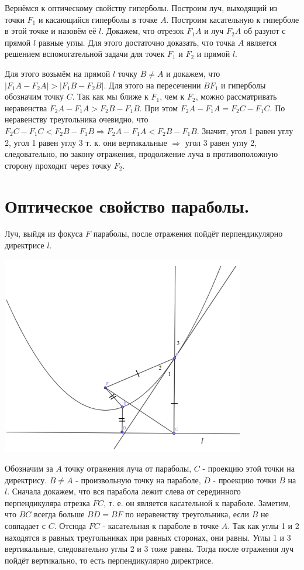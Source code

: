 \documentclass[12pt]{article}
\begin{document}
\begin{sloppypar}
    Вернёмся к оптическому свойству гиперболы. Построим луч, выходящий из точки $F_1$ и касающийся гиперболы в точке $A$. Построим касательную к гиперболе в этой точке и назовём её $l$. Докажем, что отрезок $F_1A$ и луч $F_2A$ об разуют с прямой $l$ равные углы. Для этого достаточно доказать, что точка $A$ является решением вспомогательной задачи для точек $F_1$ и $F_2$ и прямой $l$.

    Для этого возьмём на прямой $l$ точку $B \neq A$ и докажем, что $|F_1A - F_2A| > |F_1B - F_2B|$. Для этого на пересечении $BF_1$ и гиперболы обозначим точку $C$. Так как мы ближе к $F_1$, чем к $F_2$, можно рассматривать неравенства $F_2A - F_1A > F_2B - F_1B$. При этом $F_2A - F_1A = F_2C - F_1C$. По неравенству треугольника очевидно, что $F_2C - F_1C < F_2B - F_1B \Rightarrow F_2A - F_1A < F_2B - F_1B$. Значит, угол 1 равен углу 2, угол 1 равен углу 3 т. к. они вертикальные $\Rightarrow$ угол 3 равен углу 2, следовательно, по закону отражения, продолжение луча в противоположную сторону проходит через точку $F_2$.


    \section{Оптическое свойство параболы.}
    Луч, выйдя из фокуса $F$ параболы, после отражения пойдёт перпендикулярно директрисе $l$.

    \includegraphics[width=0.8\textwidth]{graphics/Парабола.png}

    Обозначим за $A$ точку отражения луча от параболы, $C$ - проекцию этой точки на директрису. $B \neq A$ - произвольную точку на параболе, $D$ - проекцию точки $B$ на $l$. Сначала докажем, что вся парабола лежит слева от серединного перпендикуляра отрезка $FC$, т. е. он является касательной к параболе. Заметим, что $BC$ всегда больше $BD = BF$ по неравенству треугольника, если $B$ не совпадает с $C$. Отсюда $FC$ - касательная к параболе в точке $A$. Так как углы 1 и 2 находятся в равных треугольниках при равных сторонах, они равны. Углы 1 и 3 вертикальные, следовательно углы 2 и 3 тоже равны. Тогда после отражения луч пойдёт вертикально, то есть перпендикулярно директрисе.


\end{sloppypar}
\end{document}
